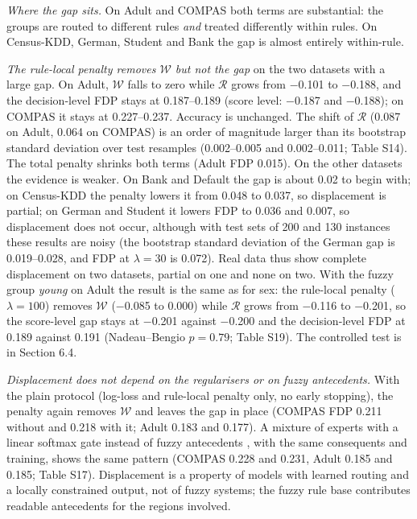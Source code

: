 \documentclass[pdflatex,sn-basic,Numbered,lineno]{sn-jnl}
\begin{document}
\emph{Where the gap sits.} On Adult and COMPAS both terms are substantial: the groups are routed to different rules \emph{and} treated differently within rules. On Census-KDD, German, Student and Bank the gap is almost entirely within-rule.

\emph{The rule-local penalty removes \(\mathcal W\) but not the gap} on the two datasets with a large gap. On Adult, \(\mathcal W\) falls to zero while \(\mathcal R\) grows from \ensuremath{-}0.101 to \ensuremath{-}0.188, and the decision-level FDP stays at 0.187--0.189 (score level: \ensuremath{-}0.187 and \ensuremath{-}0.188); on COMPAS it stays at 0.227--0.237. Accuracy is unchanged. The shift of \(\mathcal R\) (0.087 on Adult, 0.064 on COMPAS) is an order of magnitude larger than its bootstrap standard deviation over test resamples (0.002--0.005 and 0.002--0.011; Table S14). The total penalty shrinks both terms (Adult FDP 0.015). On the other datasets the evidence is weaker. On Bank and Default the gap is about 0.02 to begin with; on Census-KDD the penalty lowers it from 0.048 to 0.037, so displacement is partial; on German and Student it lowers FDP to 0.036 and 0.007, so displacement does not occur, although with test sets of 200 and 130 instances these results are noisy (the bootstrap standard deviation of the German gap is 0.019--0.028, and FDP at \(\lambda = 30\) is 0.072). Real data thus show complete displacement on two datasets, partial on one and none on two. With the fuzzy group \emph{young} on Adult the result is the same as for sex: the rule-local penalty (\(\lambda = 100\)) removes \(\mathcal W\) (\ensuremath{-}0.085 to 0.000) while \(\mathcal R\) grows from \ensuremath{-}0.116 to \ensuremath{-}0.201, so the score-level gap stays at \ensuremath{-}0.201 against \ensuremath{-}0.200 and the decision-level FDP at 0.189 against 0.191 (Nadeau--Bengio \(p = 0.79\); Table S19). The controlled test is in Section 6.4.

\emph{Displacement does not depend on the regularisers or on fuzzy antecedents.} With the plain protocol (log-loss and rule-local penalty only, no early stopping), the penalty again removes \(\mathcal W\) and leaves the gap in place (COMPAS FDP 0.211 without and 0.218 with it; Adult 0.183 and 0.177). A mixture of experts with a linear softmax gate instead of fuzzy antecedents \cite{jacobs}, with the same consequents and training, shows the same pattern (COMPAS 0.228 and 0.231, Adult 0.185 and 0.185; Table S17). Displacement is a property of models with learned routing and a locally constrained output, not of fuzzy systems; the fuzzy rule base contributes readable antecedents for the regions involved.
\end{document}
